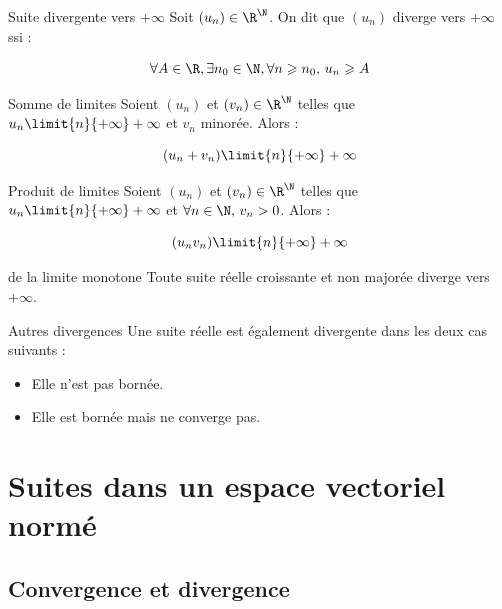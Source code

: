 \begin{definition}{Suite divergente vers $+\infty$}{}
    Soit $(u_n) \in \R^{\N}$. On dit que $(u_n)$ diverge vers $+\infty$ ssi : 

    \[\forall A \in \R, \exists n_0 \in \N, \forall n \geqslant n_0, \, u_n \geqslant A\]
\end{definition}

\begin{theoreme}{Somme de limites}{}
    Soient $(u_n)$ et $(v_n) \in \R^{\N}$ telles que 
    $u_n \limit{n}{+\infty} +\infty$ et $v_n$ minorée. Alors :

    \[(u_n + v_n) \limit{n}{+\infty} +\infty\]
\end{theoreme}

\begin{theoreme}{Produit de limites}{}
    Soient $(u_n)$ et $(v_n) \in \R^{\N}$ telles que
    $u_n \limit{n}{+\infty} +\infty$ et $\forall n \in \N, \, v_n > 0$. Alors :

    \[(u_n v_n) \limit{n}{+\infty} +\infty\]
\end{theoreme}

\begin{theoreme}{de la limite monotone}{}
    Toute suite réelle croissante et non majorée diverge vers $+\infty$.
\end{theoreme}

\begin{definition}{Autres divergences}{}
    Une suite réelle est également divergente dans les deux cas suivants : 
    \begin{itemize}
        \item Elle n'est pas bornée. 
        \item Elle est bornée mais ne converge pas.
    \end{itemize}
\end{definition}

\section{Suites dans un espace vectoriel normé}
\subsection{Convergence et divergence}

